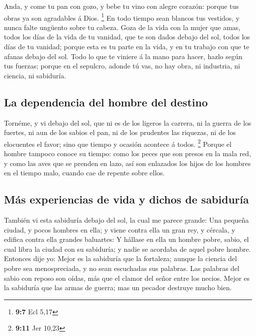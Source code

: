  Anda, y come tu pan con gozo, y bebe tu vino con alegre
corazón: porque tus obras ya son agradables á Dios. \footnote{\textbf{9:7}
  Ecl 5,17}  En todo tiempo sean blancos tus vestidos, y
nunca falte ungüento sobre tu cabeza.  Goza de la vida con
la mujer que amas, todos los días de la vida de tu vanidad, que te son
dados debajo del sol, todos los días de tu vanidad; porque esta es tu
parte en la vida, y en tu trabajo con que te afanas debajo del sol.
 Todo lo que te viniere á la mano para hacer, hazlo según
tus fuerzas; porque en el sepulcro, adonde tú vas, no hay obra, ni
industria, ni ciencia, ni sabiduría.

\hypertarget{la-dependencia-del-hombre-del-destino}{%
\subsection{La dependencia del hombre del
destino}\label{la-dependencia-del-hombre-del-destino}}

 Tornéme, y vi debajo del sol, que ni es de los ligeros
la carrera, ni la guerra de los fuertes, ni aun de los sabios el pan, ni
de los prudentes las riquezas, ni de los elocuentes el favor; sino que
tiempo y ocasión acontece á todos. \footnote{\textbf{9:11} Jer 10,23}
 Porque el hombre tampoco conoce su tiempo: como los
peces que son presos en la mala red, y como las aves que se prenden en
lazo, así son enlazados los hijos de los hombres en el tiempo malo,
cuando cae de repente sobre ellos.

\hypertarget{muxe1s-experiencias-de-vida-y-dichos-de-sabiduruxeda}{%
\subsection{Más experiencias de vida y dichos de
sabiduría}\label{muxe1s-experiencias-de-vida-y-dichos-de-sabiduruxeda}}

 También vi esta sabiduría debajo del sol, la cual me
parece grande:  Una pequeña ciudad, y pocos hombres en
ella; y viene contra ella un gran rey, y cércala, y edifica contra ella
grandes baluartes:  Y hállase en ella un hombre pobre,
sabio, el cual libra la ciudad con su sabiduría; y nadie se acordaba de
aquel pobre hombre.  Entonces dije yo: Mejor es la
sabiduría que la fortaleza; aunque la ciencia del pobre sea
menospreciada, y no sean escuchadas sus palabras.  Las
palabras del sabio con reposo son oídas, más que el clamor del señor
entre los necios.  Mejor es la sabiduría que las armas de
guerra; mas un pecador destruye mucho bien.

